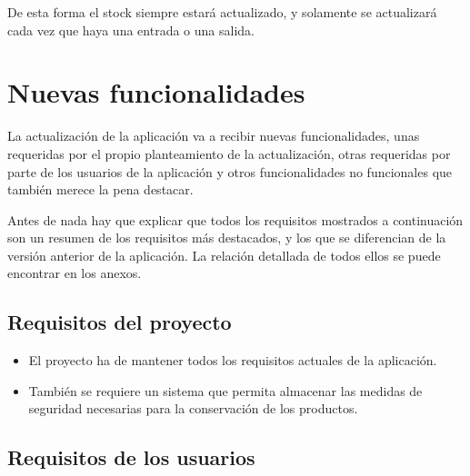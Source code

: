 De esta forma el stock siempre estará actualizado, y solamente se actualizará cada vez que haya una entrada o una salida. 


\section{Nuevas funcionalidades}

La actualización de la aplicación va a recibir nuevas funcionalidades, unas requeridas por el propio planteamiento de la actualización, otras requeridas por parte de los usuarios de la aplicación y otros funcionalidades no funcionales que también merece la pena destacar. 

Antes de nada hay que explicar que todos los requisitos mostrados a continuación son un resumen de los requisitos más destacados, y los que se diferencian de la versión anterior de la aplicación. La relación detallada de todos ellos se puede encontrar en los anexos.

\subsection{Requisitos del proyecto}

\begin{itemize}
\item El proyecto ha de mantener todos los requisitos actuales de la aplicación.

\item También se requiere un sistema que permita almacenar las medidas de seguridad necesarias para la conservación de los productos.

\end{itemize}

\subsection{Requisitos de los usuarios}

